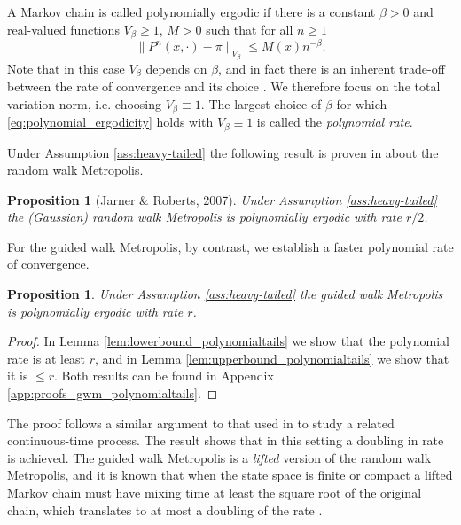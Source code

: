 \documentclass{article}
\theoremstyle{definition}
\theoremstyle{plain}
\newtheorem{proposition}[definition]{Proposition}
\begin{document}
A Markov chain is called polynomially ergodic if there is a constant $\beta > 0$ and real-valued functions $V_\beta \geq 1$, $M > 0$  such that for all $n \geq 1$
\begin{equation}
\label{eq:polynomial_ergodicity}
\|P^n(x,\cdot) - \pi\|_{V_\beta} \leq M(x) n^{-\beta}.
\end{equation}
Note that in this case $V_\beta$ depends on $\beta$, and in fact there is an inherent trade-off between the rate of convergence and its choice \citep{jarner2007convergence}. We therefore focus on the total variation norm, i.e. choosing $V_\beta \equiv 1$.  The largest choice of $\beta$ for which \eqref{eq:polynomial_ergodicity} holds with $V_\beta \equiv 1$ is called the \textit{polynomial rate}.

Under Assumption \ref{ass:heavy-tailed} the following result is proven in \citep{jarner2007convergence} about the random walk Metropolis.

\begin{proposition}[Jarner \& Roberts, 2007]
    Under Assumption \ref{ass:heavy-tailed} the (Gaussian) random walk Metropolis is polynomially ergodic with rate $r/2$.
\end{proposition}

For the guided walk Metropolis, by contrast, we establish a faster polynomial rate of convergence.

\begin{proposition}
    Under Assumption \ref{ass:heavy-tailed} the guided walk Metropolis is polynomially ergodic with rate $r$.
\end{proposition}

\begin{proof}
    In Lemma \ref{lem:lowerbound_polynomialtails} we show that the polynomial rate is at least $r$, and in Lemma \ref{lem:upperbound_polynomialtails} we show that it is $\leq r$.  Both results can be found in Appendix \ref{app:proofs_gwm_polynomialtails}.
\end{proof}

The proof follows a similar argument to that used in \citep{vasdekis2022note} to study a related continuous-time process.  The result shows that in this setting a doubling in rate is achieved.  The guided walk Metropolis is a \textit{lifted} version of the random walk Metropolis, and it is known that when the state space is finite or compact a lifted Markov chain must have mixing time at least the square root of the original chain, which translates to at most a doubling of the rate \cite{chen1999lifting,ramanan2018bounds}.
\end{document}
